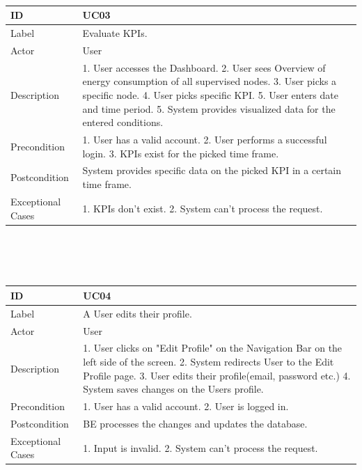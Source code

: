 \documentclass{scrreprt}
\begin{document}
\\
\\ \\ 
\begin{tabularx}{12cm}{l|X}
	ID & UC03  \\
	\hline
	Label & 
	Evaluate KPIs. \\
	\hline
	Actor            & User   \\
	\hline
	Description            &  	1. User accesses the Dashboard.	
	2. User sees Overview of energy consumption of all supervised nodes. 3. User picks a specific node. 4. User picks specific KPI. 5. User enters date and time period. 5. System provides visualized data for the entered conditions.
	\\
	\hline
	Precondition           & 1. User has a valid account. 2. User performs a successful login. 3. KPIs exist for the picked time frame.  \\
	\hline
	Postcondition     & System provides specific data on the picked KPI in a certain time frame. \\
	\hline
	Exceptional Cases & 1. KPIs don't exist. 2. System can't process the request.

\end{tabularx}
\\
\\ \\ 

\begin{tabularx}{12cm}{l|X}
	ID & UC04  \\
	\hline
	Label & 
	A User edits their profile. \\
	\hline
	Actor            & User    \\
	\hline
	Description            &  	1. User clicks on "Edit Profile" on the Navigation Bar on the left side of the screen. 2. System redirects User to the Edit Profile page. 3. User edits their profile(email, password etc.) 4. System saves changes on the Users profile.   
	\\
	\hline
	Precondition           & 1. User has a valid account. 2. User is logged in.  \\
	\hline
	Postcondition     & BE processes the changes and updates the database. \\
	\hline
	Exceptional Cases & 1. Input is invalid. 2. System can't process the request.
	
\end{tabularx}
\\
\\ \\
\end{document}
